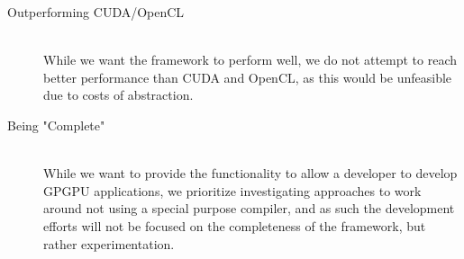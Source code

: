 \begin{description}
\item[Outperforming CUDA/OpenCL] \hfill \\
While we want the framework to perform well, we do not attempt to reach better performance than CUDA and OpenCL, as this would be unfeasible due to costs of abstraction.
\item[Being "Complete"] \hfill \\
While we want to provide the functionality to allow a developer to develop GPGPU applications, we prioritize investigating approaches to work around not using a special purpose compiler, and as such the development efforts will not be focused on the completeness of the framework, but rather experimentation.
\end{description}